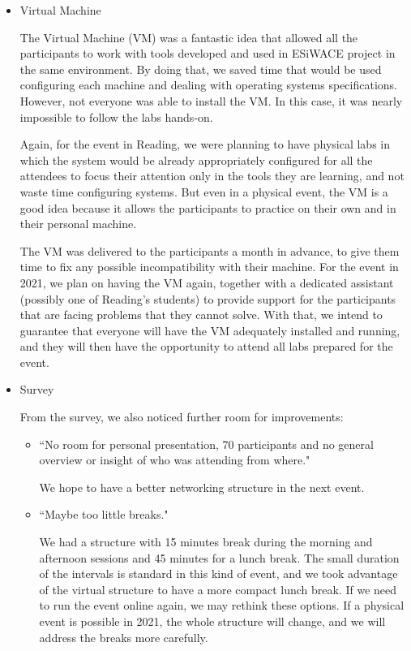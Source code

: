 \begin{itemize}
\item Virtual Machine

The Virtual Machine (VM) was a fantastic idea that allowed all the participants to work with tools developed and used in ESiWACE project in the same environment. By doing that, we saved time that would be used configuring each machine and dealing with operating systems specifications. However, not everyone was able to install the VM. In this case, it was nearly impossible to follow the labs hands-on.

Again, for the event in Reading, we were planning to have physical labs in which the system would be already appropriately configured for all the attendees to focus their attention only in the tools they are learning, and not waste time configuring systems. But even in a physical event, the VM is a good idea because it allows the participants to practice on their own and in their personal machine.

The VM was delivered to the participants a month in advance, to give them time to fix any possible incompatibility with their machine. For the event in 2021, we plan on having the VM again, together with a dedicated assistant (possibly one of Reading's students) to provide support for the participants that are facing problems that they cannot solve. With that, we intend to guarantee that everyone will have the VM adequately installed and running, and they will then have the opportunity to attend all labs prepared for the event.

\item Survey

From the survey, we also noticed further room for improvements:

\begin{itemize}

\item ``No room for personal presentation, 70 participants and no general overview or insight of
who was attending from where."

We hope to have a better networking structure in the next event.

\item ``Maybe too little breaks."

We had a structure with 15 minutes break during the morning and afternoon sessions and 45 minutes for a lunch break. The small duration of the intervals is standard in this kind of event, and we took advantage of the virtual structure to have a more compact lunch break. If we need to run the event online again, we may rethink these options. If a physical event is possible in 2021, the whole structure will change, and we will address the breaks more carefully.


\end{itemize}
\end{itemize}
